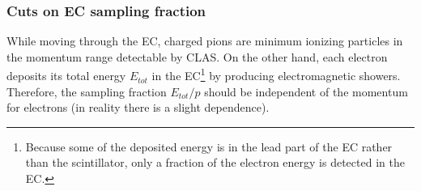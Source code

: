 \subsubsection{Cuts on EC sampling fraction}
While moving through the EC, charged pions are minimum ionizing particles in the momentum range detectable by CLAS. On the other hand, each electron deposits its total energy $E_{tot}$ in the EC\footnote{Because some of the deposited energy is in the lead part of the EC rather than the scintillator, only a fraction of the electron energy is detected in the EC.} %
by %
producing electromagnetic showers. %
Therefore, the sampling fraction $E_{tot}/p$ should be independent of the momentum for electrons (in reality there is a slight dependence). 

